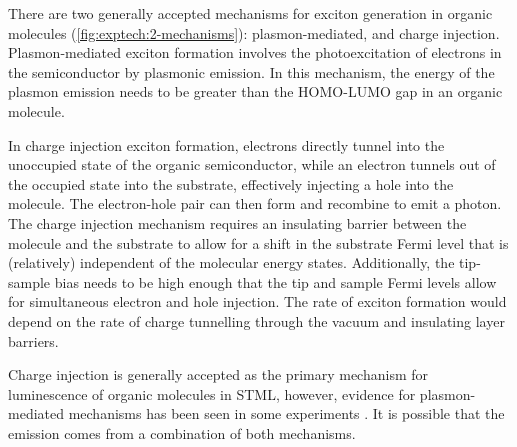 There are two generally accepted mechanisms for exciton generation in organic molecules (\autoref{fig:exptech:2-mechanisms}): plasmon-mediated, and charge injection. Plasmon-mediated exciton formation involves the photoexcitation of electrons in the semiconductor by plasmonic emission. In this mechanism, the energy of the plasmon emission needs to be greater than the \ac{HOMO}-\ac{LUMO} gap in an organic molecule. 

In charge injection exciton formation, electrons directly tunnel into the unoccupied state of the organic semiconductor, while an electron tunnels out of the occupied state into the substrate, effectively injecting a hole into the molecule. The electron-hole pair can then form and recombine to emit a photon. The charge injection mechanism requires an insulating barrier between the molecule and the substrate to allow for a shift in the substrate Fermi level that is (relatively) independent of the molecular energy states. Additionally, the tip-sample bias needs to be high enough that the tip and sample Fermi levels allow for simultaneous electron and hole injection. The rate of exciton formation would depend on the rate of charge tunnelling through the vacuum and insulating layer barriers.

Charge injection is generally accepted as the primary mechanism for luminescence of organic molecules in \ac{STML}, however, evidence for plasmon-mediated mechanisms has been seen in some experiments \citep{uemura2007local, Dong2010, zhang2012tip}. It is possible that the emission comes from a combination of both mechanisms.




